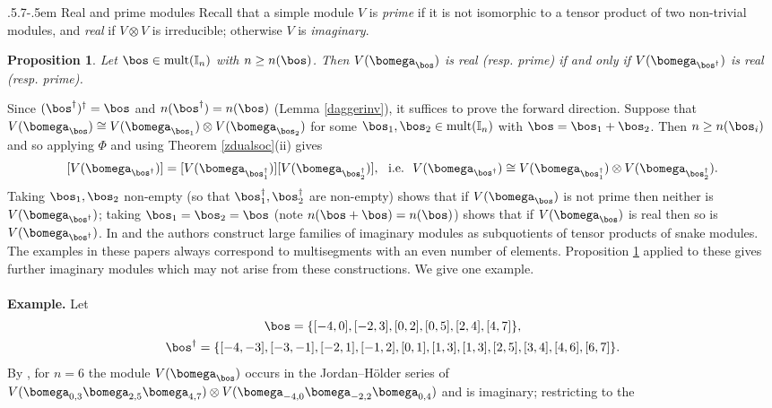 \documentclass[11pt,reqno]{amsart}
\makeatletter
\newtheorem*{prop}{Proposition}
\theoremstyle{definition} \newtheorem*{defn}{Definition}
\theoremstyle{definition}
\newenvironment{pf}{\proof}{\endproof}
\numberwithin{equation}{section}
\def\subsection{\def\@secnumfont{\bfseries}\@startsection{subsection}{2}%
  {\parindent}{.5\linespacing\@plus.7\linespacing}{-.5em}%
  {\normalfont\bfseries}}
\makeatother
\begin{document}
\subsection{Real and prime modules} Recall that a simple module $V$ is \emph{prime} if it is not isomorphic to a tensor product of two
non-trivial modules, and \emph{real} if $V\otimes V$ is irreducible; otherwise $V$ is \emph{imaginary}.
\begin{prop}\label{realprime} Let $\bos\in{\rm mult}(\mathbb I_n)$ with $n\ge n(\bos)$. Then
$V(\bomega_\bos)$ is real (resp. prime) if and only if $V(\bomega_{\bos^\dagger})$ is real (resp. prime).
\end{prop}
\begin{pf} Since $(\bos^\dagger)^\dagger=\bos$ and $n(\bos^\dagger)=n(\bos)$ (Lemma \ref{daggerinv}), it suffices to prove the forward direction. Suppose that $V(\bomega_\bos)\cong V(\bomega_{\bos_1})\otimes V(\bomega_{\bos_2})$ for some
$\bos_1,\bos_2\in{\rm mult}(\mathbb I_n)$ with $\bos=\bos_1+\bos_2$. Then $n\ge n(\bos_i)$ and so applying $\Phi$ and using
Theorem \ref{zdualsoc}(ii) gives
$$[V(\bomega_{\bos^\dagger})]=[V(\bomega_{\bos_1^\dagger})][V(\bomega_{\bos_2^\dagger})],\ \ {\rm i.e.}\ \ V(\bomega_{\bos^\dagger})\cong V(\bomega_{\bos_1^\dagger})\otimes V(\bomega_{\bos_2^\dagger}).$$
 Taking $\bos_1,\bos_2$
non-empty (so that $\bos_1^\dagger,\bos_2^\dagger$ are non-empty) shows that if $V(\bomega_\bos)$ is not prime then neither is
$V(\bomega_{\bos^\dagger})$; taking $\bos_1=\bos_2=\bos$ (note $n(\bos+\bos)=n(\bos)$) shows that if $V(\bomega_\bos)$ is real then
so is $V(\bomega_{\bos^\dagger})$.
\end{pf}
In \cite{BC23} and \cite{BM25} the authors construct large families of imaginary modules as
subquotients of tensor products of snake modules. The examples in these papers always correspond to multisegments with an even number of elements. Proposition \ref{realprime} applied to these gives further
imaginary modules which may not arise from these constructions. We give one example.\\\\
{\bf Example.} \label{primeex} Let
\begin{gather*} \bos=\{[-4,0],[-2,3],[0,2],[0,5],[2,4],[4,7]\},\\
\bos^\dagger=\{[-4,-3],[-3,-1],[-2,1],[-1,2],[0,1],[1,3],[1,3],[2,5],[3,4],[4,6],[6,7]\}.\end{gather*}
By \cite[Theorem 3]{BC23}, for $n=6$ the module $V(\bomega_\bos)$ occurs in the Jordan--H\"older series of
$V(\bomega_{0,3}\bomega_{2,5}\bomega_{4,7})\otimes V(\bomega_{-4,0}\bomega_{-2,2}\bomega_{0,4})$ and is imaginary; restricting to the
\end{document}
